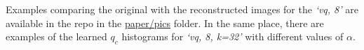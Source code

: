 \documentclass{article} %
\newcommand{\qc}{q_c}
\begin{document}
Examples comparing the original with the reconstructed images for the \emph{`vq, 8'} are available in the repo in the \href{https://bitbucket.org/dmmlgeneva/softvqae/src/master/paper/pics}{paper/pics} folder.
In the same place, there are examples of the learned $\qc$ histograms for \emph{`vq, 8, k=32'} with different values of $\alpha$.







\end{document}
